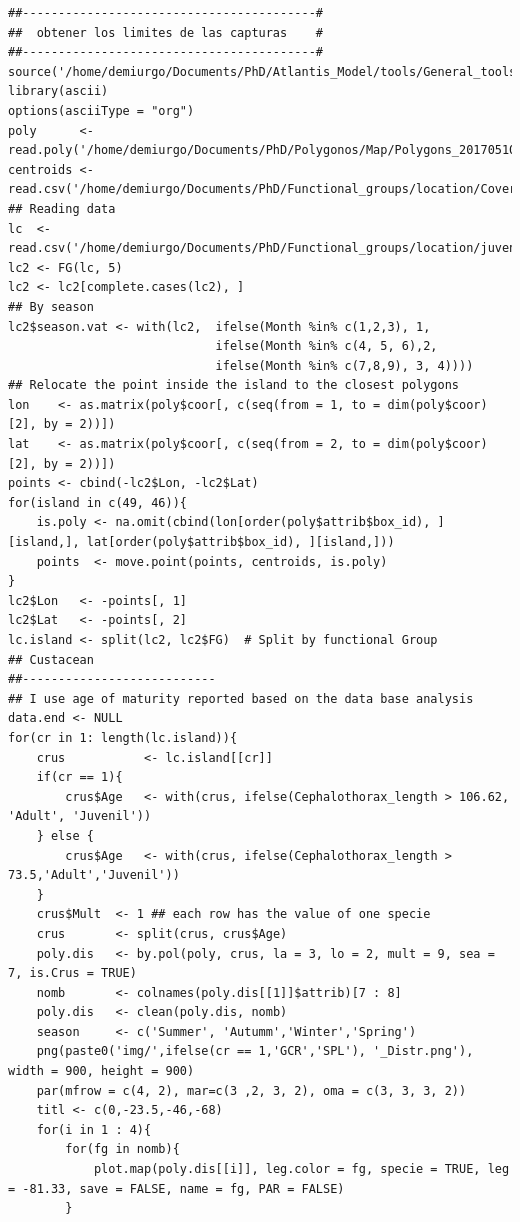 \documentclass[11pt]{article}
\begin{document}
\begin{itemize}
\begin{itemize}
\begin{itemize}
\begin{verbatim}
##-----------------------------------------#
##  obtener los limites de las capturas    #
##-----------------------------------------#
source('/home/demiurgo/Documents/PhD/Atlantis_Model/tools/General_tools/Atlantis_tools.R')
library(ascii)
options(asciiType = "org")
poly      <- read.poly('/home/demiurgo/Documents/PhD/Polygonos/Map/Polygons_20170510.csv')
centroids <- read.csv('/home/demiurgo/Documents/PhD/Functional_groups/location/Cover/centroids.csv')
## Reading data
lc  <- read.csv('/home/demiurgo/Documents/PhD/Functional_groups/location/juvenils/crustacean/spatial_size_crustaceans.csv')
lc2 <- FG(lc, 5)
lc2 <- lc2[complete.cases(lc2), ]
## By season
lc2$season.vat <- with(lc2,  ifelse(Month %in% c(1,2,3), 1,
                             ifelse(Month %in% c(4, 5, 6),2,
                             ifelse(Month %in% c(7,8,9), 3, 4))))
## Relocate the point inside the island to the closest polygons
lon    <- as.matrix(poly$coor[, c(seq(from = 1, to = dim(poly$coor)[2], by = 2))])
lat    <- as.matrix(poly$coor[, c(seq(from = 2, to = dim(poly$coor)[2], by = 2))])
points <- cbind(-lc2$Lon, -lc2$Lat)
for(island in c(49, 46)){
    is.poly <- na.omit(cbind(lon[order(poly$attrib$box_id), ][island,], lat[order(poly$attrib$box_id), ][island,]))
    points  <- move.point(points, centroids, is.poly)
}
lc2$Lon   <- -points[, 1]
lc2$Lat   <- -points[, 2]
lc.island <- split(lc2, lc2$FG)  # Split by functional Group
## Custacean
##---------------------------
## I use age of maturity reported based on the data base analysis
data.end <- NULL
for(cr in 1: length(lc.island)){
    crus           <- lc.island[[cr]]
    if(cr == 1){
        crus$Age   <- with(crus, ifelse(Cephalothorax_length > 106.62, 'Adult', 'Juvenil'))
    } else {
        crus$Age   <- with(crus, ifelse(Cephalothorax_length > 73.5,'Adult','Juvenil'))
    }
    crus$Mult  <- 1 ## each row has the value of one specie
    crus       <- split(crus, crus$Age)
    poly.dis   <- by.pol(poly, crus, la = 3, lo = 2, mult = 9, sea = 7, is.Crus = TRUE)
    nomb       <- colnames(poly.dis[[1]]$attrib)[7 : 8]
    poly.dis   <- clean(poly.dis, nomb)
    season     <- c('Summer', 'Autumm','Winter','Spring')
    png(paste0('img/',ifelse(cr == 1,'GCR','SPL'), '_Distr.png'), width = 900, height = 900)
    par(mfrow = c(4, 2), mar=c(3 ,2, 3, 2), oma = c(3, 3, 3, 2))
    titl <- c(0,-23.5,-46,-68)
    for(i in 1 : 4){
        for(fg in nomb){
            plot.map(poly.dis[[i]], leg.color = fg, specie = TRUE, leg = -81.33, save = FALSE, name = fg, PAR = FALSE)
        }

\end{verbatim}
\end{itemize}
\end{itemize}
\end{itemize}
\end{document}
